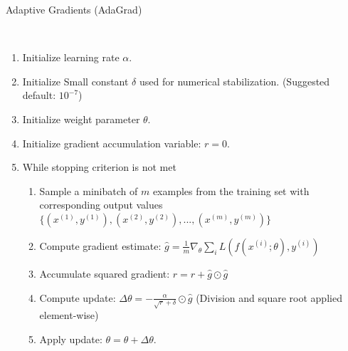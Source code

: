 \begin{algorithm}
	\caption{Adaptive Gradients (AdaGrad)  \cite{goodfellow2016deep}}\label{alg:adaGrad}
	\begin{algorithmic}
		\\
		\begin{enumerate}
			\item Initialize learning rate $\alpha$.		
			\item Initialize Small constant $\delta$ used for numerical stabilization. (Suggested default: $10^{-7}$)
			\item Initialize weight parameter $\theta$.
			\item Initialize gradient accumulation variable: $r = 0$.
			\item While stopping criterion is not met
			\begin{enumerate}[label=\emph{\alph*})]
				\item Sample a minibatch of $m$ examples from the training set with corresponding output values
				$\{(x^{(1)}, y^{(1)}), (x^{(2)}, y^{(2)}), ..., (x^{(m)}, y^{(m)})\}$
				\item Compute gradient estimate: $\hat{g} = \frac{1}{m} \nabla_\theta \sum_i L(f(x^{(i)};\theta), y^{(i)})$
				\item Accumulate squared gradient: $r = r + \hat{g} \odot \hat{g}$
				\item Compute update: $\Delta \theta = - \frac{\alpha}{\sqrt{r} + \delta} \odot \hat{g}$ (Division and square root applied element-wise)
				\item Apply update: $\theta = \theta + \Delta \theta$.
			\end{enumerate}
		\end{enumerate}
	\end{algorithmic}
\end{algorithm}

